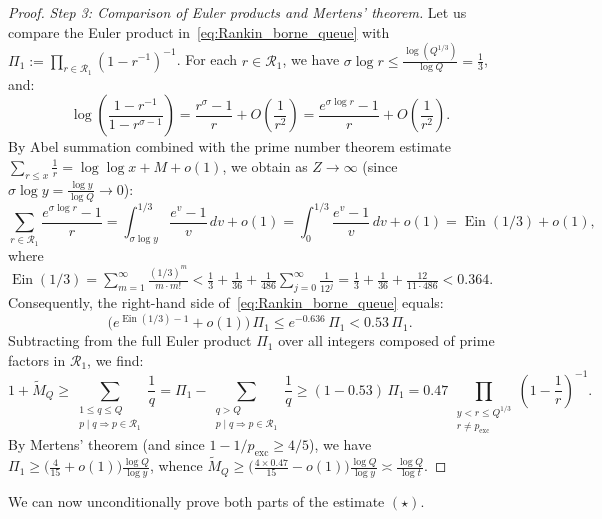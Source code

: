 \documentclass[11pt, a4paper]{article}
\theoremstyle{plain}
\theoremstyle{definition}
\begin{document}
\begin{proof}
\medskip\noindent
\emph{Step 3: Comparison of Euler products and Mertens' theorem.} Let us compare the Euler product in~\eqref{eq:Rankin_borne_queue} with $\Pi_1 := \prod_{r \in \mathcal{R}_1} (1 - r^{-1})^{-1}$. For each $r \in \mathcal{R}_1$, we have $\sigma \log r \le \frac{\log(Q^{1/3})}{\log Q} = \frac{1}{3}$, and:
\[
\log\!\left(\frac{1 - r^{-1}}{1 - r^{\sigma - 1}}\right) = \frac{r^\sigma - 1}{r} + O\!\left(\frac{1}{r^2}\right) = \frac{e^{\sigma \log r} - 1}{r} + O\!\left(\frac{1}{r^2}\right).
\]
By Abel summation combined with the prime number theorem estimate $\sum_{r \le x} \frac{1}{r} = \log\log x + M + o(1)$, we obtain as $Z \to \infty$ (since $\sigma \log y = \frac{\log y}{\log Q} \to 0$):
\[
\sum_{r \in \mathcal{R}_1} \frac{e^{\sigma \log r} - 1}{r} = \int_{\sigma \log y}^{1/3} \frac{e^v - 1}{v}\,dv + o(1) = \int_0^{1/3} \frac{e^v - 1}{v}\,dv + o(1) = \operatorname{Ein}(1/3) + o(1),
\]
where $\operatorname{Ein}(1/3) = \sum_{m=1}^\infty \frac{(1/3)^m}{m \cdot m!} < \frac{1}{3} + \frac{1}{36} + \frac{1}{486}\sum_{j=0}^\infty \frac{1}{12^j} = \frac{1}{3} + \frac{1}{36} + \frac{12}{11 \cdot 486} < 0.364$. Consequently, the right-hand side of~\eqref{eq:Rankin_borne_queue} equals:
\[
\big(e^{\operatorname{Ein}(1/3) - 1} + o(1)\big)\,\Pi_1 \le e^{-0.636}\,\Pi_1 < 0.53\,\Pi_1.
\]
Subtracting from the full Euler product $\Pi_1$ over all integers composed of prime factors in $\mathcal{R}_1$, we find:
\[
1 + \widetilde{M}_Q \ge \sum_{\substack{1 \le q \le Q \\ p \mid q \Rightarrow p \in \mathcal{R}_1}} \frac{1}{q} = \Pi_1 - \sum_{\substack{q > Q \\ p \mid q \Rightarrow p \in \mathcal{R}_1}} \frac{1}{q} \ge (1 - 0.53)\,\Pi_1 = 0.47\,\prod_{\substack{y < r \le Q^{1/3} \\ r \ne p_{\mathrm{exc}}}}\left(1 - \frac{1}{r}\right)^{-1}.
\]
By Mertens' theorem (and since $1 - 1/p_{\mathrm{exc}} \ge 4/5$), we have $\Pi_1 \ge \big(\frac{4}{15} + o(1)\big)\frac{\log Q}{\log y}$, whence $\widetilde{M}_Q \ge \big(\frac{4 \times 0.47}{15} - o(1)\big)\frac{\log Q}{\log y} \asymp \frac{\log Q}{\log t}$.
\end{proof}

We can now unconditionally prove both parts of the estimate $(\star)$.
\end{document}
